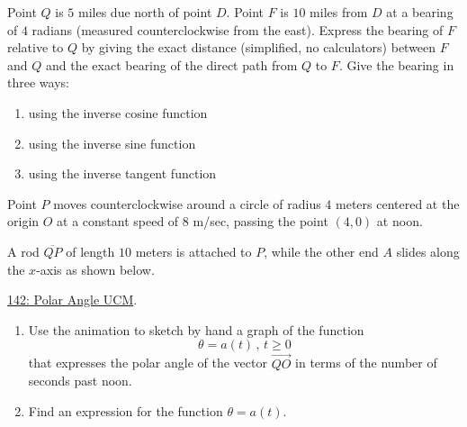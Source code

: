 \documentclass{ximera}
\begin{document}
\begin{question} \label{QEggdR34rRER}
Point $Q$ is $5$ miles due north of point $D$. Point $F$ is $10$ miles from $D$ at a bearing of $4$ radians (measured counterclockwise from the east). Express the bearing of $F$ relative to $Q$ by giving the exact distance (simplified, no calculators) between $F$ and $Q$ and the exact bearing of the direct path from $Q$ to $F$. Give the bearing in three ways:

\begin{enumerate}
\item using the inverse cosine function

\item using the inverse sine function

\item using the inverse tangent function

\end{enumerate}
\end{question}

\begin{question} \label{QOgggERE34rd}

Point $P$ moves counterclockwise around a circle of radius $4$ meters centered at the origin $O$ at a constant speed of $8$ m/sec, passing the point $(4,0)$ at noon.


A rod $\overline{QP}$ of length $10$ meters is attached to $P$, while the other end $A$ slides along the $x$-axis as shown below. 
 
\href{https://www.desmos.com/calculator/jec1aoz1l3}{142: Polar Angle UCM}.

 
\begin{onlineOnly}
    \begin{center}
\end{center}
\end{onlineOnly}


\begin{enumerate}

\item Use the animation to sketch by hand a graph of the function
\[
    \theta = a(t) \, , \, t\geq 0
\]
that expresses the polar angle of the vector $\overrightarrow{QO}$ in terms of the number of seconds past noon.

\item Find an expression for the function $\theta = a(t)$.

\end{enumerate}
\end{question}
\end{document}
